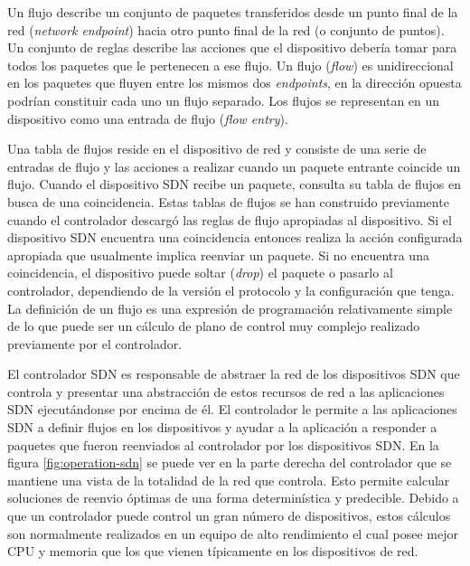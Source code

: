 \documentclass[10pt,journal,compsoc]{IEEEtran}
\begin{document}
Un flujo describe un conjunto de paquetes transferidos desde un punto final de la red (\emph{network endpoint}) hacia otro punto final de la red (o conjunto de puntos). Un conjunto de reglas describe las acciones que el dispositivo debería tomar para todos los paquetes que le pertenecen a ese flujo. Un flujo (\emph{flow}) es unidireccional en los paquetes que fluyen entre los mismos dos \emph{endpoints}, en la dirección opuesta podrían constituir cada uno un flujo separado. Los flujos se representan en un dispositivo como una entrada de flujo (\emph{flow entry}).

\label{sec:tabla-flujos}
Una tabla de flujos reside en el dispositivo de red y consiste de una serie de entradas de flujo y las acciones a realizar cuando un paquete entrante coincide un flujo. Cuando el dispositivo SDN recibe un paquete, consulta su tabla de flujos en busca de una coincidencia. Estas tablas de flujos se han construido previamente cuando el controlador descargó las reglas de flujo apropiadas al dispositivo. Si el dispositivo SDN encuentra una coincidencia entonces realiza la acción configurada apropiada que usualmente implica reenviar un paquete. Si no encuentra una coincidencia, el dispositivo puede soltar (\emph{drop}) el paquete o pasarlo al controlador, dependiendo de la versión el protocolo y la configuración que tenga. La definición de un flujo es una expresión de programación relativamente simple de lo que puede ser un cálculo de plano de control muy complejo realizado previamente por el controlador.

El controlador SDN es responsable de abstraer la red de los dispositivos SDN que controla y presentar una abstracción de estos recursos de red a las aplicaciones SDN ejecutándonse por encima de él. El controlador le permite a las aplicaciones SDN a definir flujos en los dispositivos y ayudar a la aplicación a responder a paquetes que fueron reenviados al controlador por los dispositivos SDN. En la figura \ref{fig:operation-sdn} se puede ver en la parte derecha del controlador que se mantiene una vista de la totalidad de la red que controla. Esto permite calcular soluciones de reenvio óptimas de una forma determinística y predecible. Debido a que un controlador puede control un gran número de dispositivos, estos cálculos son normalmente realizados en un equipo de alto rendimiento el cual posee mejor CPU y memoria que los que vienen típicamente en los dispositivos de red.
\end{document}
